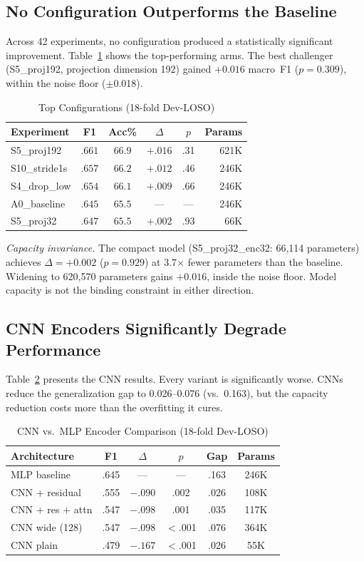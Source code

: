 \documentclass[conference]{IEEEtran}
\begin{document}
\subsection{No Configuration Outperforms the Baseline}
Across 42 experiments, no configuration produced a statistically significant improvement. Table~\ref{tab:top_experiments} shows the top-performing arms. The best challenger (S5\_proj192, projection dimension 192) gained $+0.016$ macro~F1 ($p = 0.309$), within the noise floor ($\pm$0.018).

\begin{table}[t]
\centering
\caption{Top Configurations (18-fold Dev-LOSO)}
\label{tab:top_experiments}
\begin{tabular}{lccccr}
\toprule
\textbf{Experiment} & \textbf{F1} & \textbf{Acc\%} & $\Delta$ & $p$ & \textbf{Params} \\
\midrule
S5\_proj192 & $.661$ & $66.9$ & $+.016$ & .31 & 621K \\
S10\_stride1s & $.657$ & $66.2$ & $+.012$ & .46 & 246K \\
S4\_drop\_low & $.654$ & $66.1$ & $+.009$ & .66 & 246K \\
A0\_baseline & $.645$ & $65.5$ & --- & --- & 246K \\
S5\_proj32 & $.647$ & $65.5$ & $+.002$ & .93 & 66K \\
\bottomrule
\end{tabular}
\end{table}

\noindent\textit{Capacity invariance.} The compact model (S5\_proj32\_enc32: 66{,}114 parameters) achieves $\Delta = +0.002$ ($p = 0.929$) at 3.7$\times$ fewer parameters than the baseline. Widening to 620{,}570 parameters gains $+0.016$, inside the noise floor. Model capacity is not the binding constraint in either direction.

\subsection{CNN Encoders Significantly Degrade Performance}
Table~\ref{tab:cnn} presents the CNN results. Every variant is significantly worse. CNNs reduce the generalization gap to 0.026--0.076 (vs.\ 0.163), but the capacity reduction costs more than the overfitting it cures.

\begin{table}[t]
\centering
\caption{CNN vs.\ MLP Encoder Comparison (18-fold Dev-LOSO)}
\label{tab:cnn}
\begin{tabular}{lccccc}
\toprule
\textbf{Architecture} & \textbf{F1} & $\Delta$ & $p$ & \textbf{Gap} & \textbf{Params} \\
\midrule
MLP baseline & .645 & --- & --- & .163 & 246K \\
CNN + residual & .555 & $-.090$ & .002 & .026 & 108K \\
CNN + res + attn & .547 & $-.098$ & .001 & .035 & 117K \\
CNN wide (128) & .547 & $-.098$ & $<$.001 & .076 & 364K \\
CNN plain & .479 & $-.167$ & $<$.001 & .026 & 55K \\
\bottomrule
\end{tabular}
\end{table}
\end{document}
